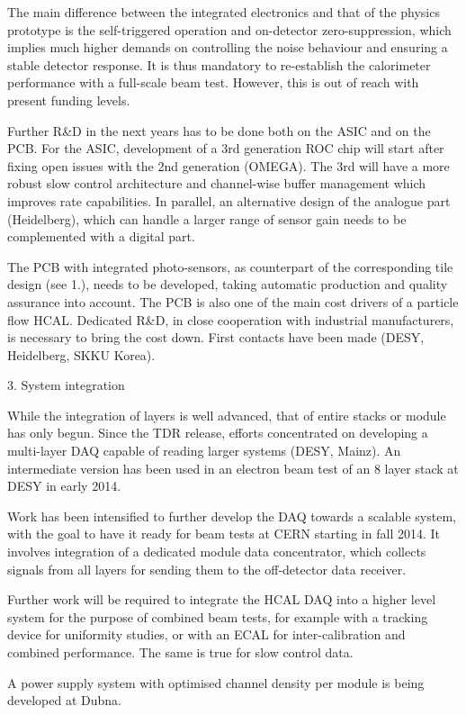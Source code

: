 The main difference between the integrated electronics and that of the physics prototype is the self-triggered operation and on-detector zero-suppression, which implies much higher demands on controlling the noise behaviour and ensuring a stable detector response. It is thus mandatory to re-establish the calorimeter performance with a full-scale beam test. However, this is out of reach with present funding levels.

Further R\&D in the next years has to be done both on the ASIC and on the PCB. For the ASIC, development of a 3rd generation ROC chip will start after fixing open issues with the 2nd generation (OMEGA). The 3rd will have a more robust slow control architecture and channel-wise buffer management which improves rate capabilities. In parallel, an alternative design of the analogue part (Heidelberg), which can handle a larger range of sensor gain needs to be complemented with a digital part.

The PCB with integrated photo-sensors, as counterpart of the corresponding tile design (see 1.), needs to be developed, taking automatic production and quality assurance into account. The PCB is also one of the main cost drivers of a particle flow HCAL. Dedicated R\&D, in close cooperation with industrial manufacturers, is necessary to bring the cost down. First contacts have been made (DESY, Heidelberg, SKKU Korea).

3.  System integration

While the integration of layers is well advanced, that of entire stacks or module has only begun. Since the TDR release, efforts concentrated on developing a multi-layer DAQ capable of reading larger systems (DESY, Mainz). An intermediate version has been used in an electron beam test of an 8 layer stack at DESY in early 2014.

Work has been intensified to further develop the DAQ towards a scalable system, with the goal to have it ready for beam tests at CERN starting in fall 2014. It involves integration of a dedicated module data concentrator, which collects signals from all layers for sending them to the off-detector data receiver.

Further work will be required to integrate the HCAL DAQ into a higher level system for the purpose of combined beam tests, for example with a tracking device for uniformity studies, or with an ECAL for inter-calibration and combined performance. The same is true for slow control data.

A power supply system with optimised channel density per module is being developed at Dubna.

